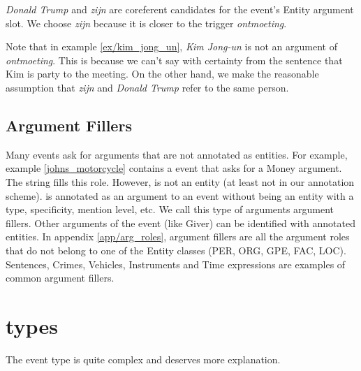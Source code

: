 \begin{exe}
    \ex\label{ex/kim_jong_un} 
        \expl {}
        \expl \emph{Donald Trump} and \emph{zijn} are coreferent candidates for the event's Entity argument slot. We choose \emph{zijn} because it is closer to the trigger \emph{ontmoeting}.
\end{exe}

Note that in example \ref{ex/kim_jong_un}, \emph{Kim Jong-un} is not an argument of \emph{ontmoeting}. This is because we can't say with certainty from the sentence that Kim is party to the meeting. On the other hand, we make the reasonable assumption that \emph{zijn} and \emph{Donald Trump} refer to the same person.

\subsection{Argument Fillers}

Many events ask for arguments that are not annotated as entities. For example, example \ref{johns_motorcycle} contains a  event that asks for a Money argument. The string  fills this role. However,  is not an entity (at least not in our annotation scheme).  is annotated as an argument to an event without being an entity with a type, specificity, mention level, etc. We call this type of arguments argument fillers. Other arguments of the event (like Giver) can be identified with annotated entities. In appendix \ref{app/arg_roles}, argument fillers are all the argument roles that do not belong to one of the Entity classes (PER, ORG, GPE, FAC, LOC). Sentences, Crimes, Vehicles, Instruments and Time expressions are examples of common argument fillers.

\begin{exe}
    \ex\label{johns_motorcycle} 
\end{exe}


\section{ types}

The  event type is quite complex and deserves more explanation.

